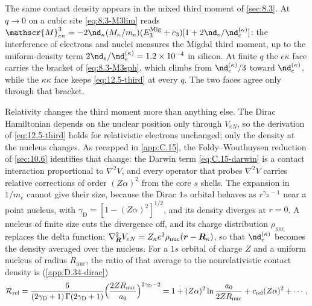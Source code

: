 The same contact density appears in the mixed third moment of \cref{sec:8.3}. At $q \to 0$ on a cubic site \cref{eq:8.3-M3lim} reads $\mathscr{M}^3_{e\kappa} = -2\nd_\kappa(M_\kappa/m_e)(E^{\mathrm{Mig}}_3 + c_3)[1 + 2\nd_e/\nd_e^{(\kappa)}]$: the interference of electrons and nuclei measures the Migdal third moment, up to the uniform-density term $2\nd_e/\nd_e^{(\kappa)} = 1.2\times10^{-4}$ in silicon. At finite $q$ the $e\kappa$ face carries the bracket of \cref{eq:8.3-M3sph}, which climbs from $\nd_e^{(\kappa)}/3$ toward $\nd_e^{(\kappa)}$, while the $\kappa\kappa$ face keeps \cref{eq:12.5-third} at every $q$. The two faces agree only through that bracket.

Relativity changes the third moment more than anything else. The Dirac Hamiltonian depends on the nuclear position only through $V_{eN}$, so the derivation of \cref{eq:12.5-third} holds for relativistic electrons unchanged; only the density at the nucleus changes. As recapped in \cref{app:C.15}, the Foldy--Wouthuysen reduction of \cref{sec:10.6} identifies that change: the Darwin term \cref{eq:C.15-darwin} is a contact interaction proportional to $\nabla^2V$, and every operator that probes $\nabla^2V$ carries relative corrections of order $(Z\alpha)^2$ from the core $s$ shells. The expansion in $1/m_e$ cannot give their size, because the Dirac $1s$ orbital behaves as $r^{\gamma_{\mathrm{D}} - 1}$ near a point nucleus, with $\gamma_{\mathrm{D}} = [1 - (Z\alpha)^2]^{1/2}$, and its density diverges at $r = 0$. A nucleus of finite size cuts the divergence off, and its charge distribution $\rho_{\mathrm{nuc}}$ replaces the delta function: $\nabla^2_{\bm{R}}V_{eN} = Z_\kappa e^2\rho_{\mathrm{nuc}}(\bm{r} - \bm{R}_\kappa)$, so that $\nd_e^{(\kappa)}$ becomes the density averaged over the nucleus. For a $1s$ orbital of charge $Z$ and a uniform nucleus of radius $R_{\mathrm{nuc}}$, the ratio of that average to the nonrelativistic contact density is (\cref{app:D.34-dirac})
\begin{equation}
  \mathcal{R}_{\mathrm{rel}} = \frac{6}{(2\gamma_{\mathrm{D}} + 1)\,\Gamma(2\gamma_{\mathrm{D}} + 1)}\Bigl(\frac{2ZR_{\mathrm{nuc}}}{a_0}\Bigr)^{2\gamma_{\mathrm{D}} - 2}
  = 1 + (Z\alpha)^2\ln\frac{a_0}{2ZR_{\mathrm{nuc}}} + c_{\mathrm{rel}}(Z\alpha)^2 + \cdots ,
  \label{eq:12.5-Rrel}
\end{equation}
